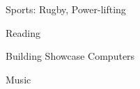 

\begin{cventries}

  \cventry
    {} %
    {} %
    {} %
    {} %
    {
      \begin{cvitems} %
        \item {Sports: Rugby, Power-lifting}
        \item {Reading}
        \item {Building Showcase Computers}
         \item {Music}
      \end{cvitems}
    }


\end{cventries}
